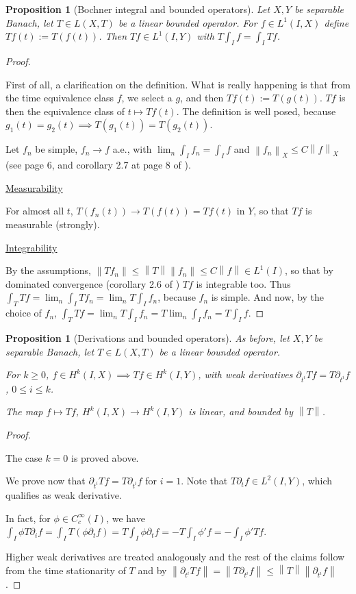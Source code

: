 \documentclass[english,a4paper,10pt,oneside]{scrbook}	%
\theoremstyle{break}
\newtheorem{prop}[equation]{Proposition}
\newenvironment{mproof}[1][\proofname]{%
  \begin{proof}[#1]$ $\par\nobreak\ignorespaces
}{%
  \end{proof}
}
\renewcommand*{\proofname}{Proof}
\theoremstyle{remark}
\newcommand{\norm}[1]{\left\lVert#1\right\rVert}
\begin{document}
\begin{prop}[Bochner integral and bounded operators]
\label{prop:bochner_bound}
Let $X,Y$ be separable Banach, let $T \in L(X,T)$ be a linear bounded operator. For $f \in L^1(I,X)$ define $Tf (t):= T(f(t))$. Then $Tf \in L^1(I,Y)$ with $T\int_I f = \int_I Tf$.
\end{prop}
\begin{mproof}

First of all, a clarification on the definition. What is really happening is that from the time equivalence class $f$, we select a $g$, and then $Tf(t):=T(g(t))$. $Tf$ is then the equivalence class of $t\mapsto Tf(t)$. The definition is well posed, because $g_1(t)=g_2(t)\implies T(g_1(t))=T(g_2(t))$.

Let $f_n$ be simple, $f_n\rightarrow f $ a.e., with $\lim_n \int_I f_n = \int_I f$ and $\norm{f_n}_X \leq C \norm{f}_X$ (see page 6, and corollary 2.7 at page 8 of \cite{kreuter}).

\underline{Measurability}

For almost all $t$, $T(f_n(t)) \rightarrow T(f(t))=Tf(t)$ in $Y$, so that $Tf$ is measurable (strongly).

\underline{Integrability}

By the assumptions, $\norm{Tf_n}\leq \norm{T}\norm{f_n}\leq C\norm{f}\in L^1(I)$, so that by dominated convergence (corollary 2.6 of \cite{kreuter}) $Tf$ is integrable too. Thus $\int_T Tf = \lim_n \int_I  Tf_n = \lim_n T\int_I  f_n$, because $f_n$ is simple. And now, by the choice of $f_n$, $\int_T Tf = \lim_n T\int_I  f_n = T \lim_n \int_I  f_n = T \int_I f$.

\end{mproof}

\begin{prop}	[Derivations and bounded operators]
\label{lemma:bochner_Hk_map}
As before, let $X,Y$ be separable Banach, let $T \in L(X,T)$ be a linear bounded operator.

For $k\geq 0$, $f \in H^k(I,X)\implies Tf \in H^k(I,Y)$, with weak derivatives $\partial_{t^i}Tf = T\partial_{t^i}f$, $0\leq i \leq k$.

The map $f \mapsto Tf$, $H^k(I,X)\rightarrow H^k(I,Y)$ is linear, and bounded by $\norm{T}$.
\end{prop}
\begin{mproof}
The case $k=0$ is proved above.

We prove now that $\partial_{t^i}Tf = T\partial_{t^i}f$ for $i=1$. Note that $T\partial_t f \in L^2(I,Y)$, which qualifies as weak derivative.

In fact, for $\phi \in C_c^\infty(I)$, we have $\int_I \phi T\partial_i f = \int_I T(\phi\partial_t f) = T \int_I\phi\partial_t f = -T\int_I\phi'f=-\int_I\phi'Tf$.

Higher weak derivatives are treated analogously and the rest of the claims follow from the time stationarity of $T$ and by $\norm{\partial_{t^i}Tf}=\norm{T\partial_{t^i}f}\leq \norm{T}\norm{\partial_{t^i}f}$.

\end{mproof}
\end{document}
